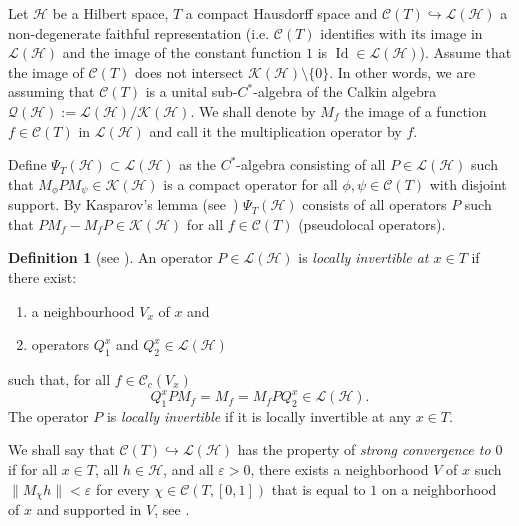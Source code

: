 \documentclass[11pt,a4paper]{amsart}
\newcommand{\maC}{\mathcal C}
\newcommand{\maH}{\mathcal H}
\newcommand{\maK}{\mathcal K}
\newcommand{\maL}{\mathcal L}
\newcommand{\maQ}{\mathcal Q}
\newcommand\<{\langle}
\renewcommand\>{\rangle}
\newcommand{\oid}{\operatorname{Id}}
\theoremstyle{definition}
\newtheorem{definition}[theorem]{Definition}
\begin{document}
Let $\maH$ be a Hilbert space, $T$ a compact Hausdorff space  and  $\maC(T) \hookrightarrow \maL(\maH)$  a non-degenerate faithful
representation (i.e. $\maC(T)$ identifies with its image in $\maL(\maH)$ and the image of the
constant function $1$ is $\oid \in \maL(\maH)$). 
Assume that the image of $\maC(T)$ does not intersect
 $\maK(\maH) \setminus \{0\}$. In other words, we are assuming that $\maC(T)$ is a unital sub-$C^*$-algebra
of the Calkin algebra $\maQ(\maH) := \maL(\maH)/\maK(\maH)$. We shall denote by $M_f$ the image of a
function $f\in \maC(T)$ in $\maL(\maH)$ and call it the multiplication operator by $f$.


Define $\Psi_{T}(\maH) \subset \maL(\maH)$ as the $C^*$-algebra consisting of all
$P \in \maL(\maH)$ such that $M_\phi PM_\psi  \in \maK(\maH)$ is a compact operator 
for all $\phi,\psi \in \maC(T)$ with disjoint support.  
By  Kasparov's lemma (see~\cite[Lemma 5.4.7]{HiRo1})  $\Psi_T(\maH)$ consists of all operators $P$ such that $PM_f - M_f P \in \maK(\maH)$ for all $ f \in \maC(T)$ (pseudolocal operators).




\begin{definition}[see \cite{Baldare.Simonenko,BCLN2}]\label{locinv}
An operator $P \in \maL(\maH)$ is  {\em locally invertible at $x \in T$}  if
there exist:
\begin{enumerate}
\item[(i)] a neighbourhood $V_x$ of $x$ and
\item[(ii)] operators $Q^x_1$ and $Q^x_2 \in \maL(\maH)$
\end{enumerate}
such that, for all $f \in \maC_c(V_x)$
\begin{equation*}
Q^x_1 PM_f = M_f =M_fPQ^x_2 \in \maL (\maH).
\end{equation*}
The operator $P$ is  {\em locally invertible} if it is locally invertible at any $x \in T$.
\end{definition} 

We shall say that $\maC(T) \hookrightarrow \maL(\maH)$ has the property of {\em strong convergence to $0$} if  for all
$x\in T$, all $ h\in \maH$, and all $ \varepsilon >0$, there exists a neighborhood $V$ of $x$
such %
$\|M_{\chi}h\|<\varepsilon$
for every  $\chi \in \maC(T,[0,1])$ that is equal to $1$ on a neighborhood of $x$ and supported in $V$, 
see \cite[Definition 2.9]{Baldare.Simonenko}.  
\end{document}
